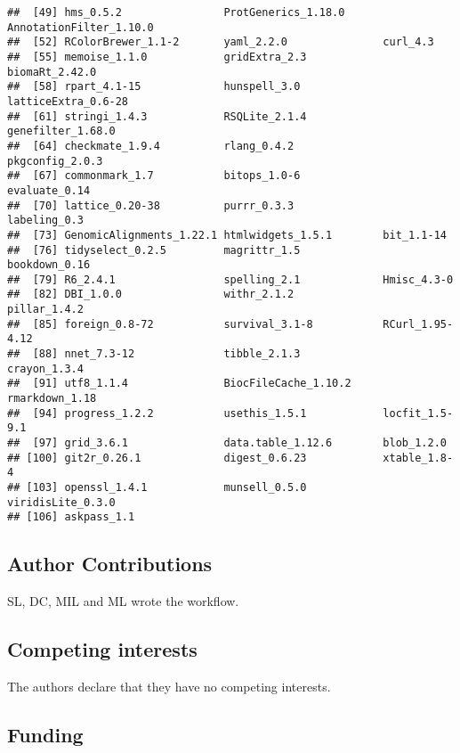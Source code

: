 \documentclass[
  9pt,
  a4paper,
]{extarticle}
\begin{document}
\begin{verbatim}
##  [49] hms_0.5.2                ProtGenerics_1.18.0      AnnotationFilter_1.10.0 
##  [52] RColorBrewer_1.1-2       yaml_2.2.0               curl_4.3                
##  [55] memoise_1.1.0            gridExtra_2.3            biomaRt_2.42.0          
##  [58] rpart_4.1-15             hunspell_3.0             latticeExtra_0.6-28     
##  [61] stringi_1.4.3            RSQLite_2.1.4            genefilter_1.68.0       
##  [64] checkmate_1.9.4          rlang_0.4.2              pkgconfig_2.0.3         
##  [67] commonmark_1.7           bitops_1.0-6             evaluate_0.14           
##  [70] lattice_0.20-38          purrr_0.3.3              labeling_0.3            
##  [73] GenomicAlignments_1.22.1 htmlwidgets_1.5.1        bit_1.1-14              
##  [76] tidyselect_0.2.5         magrittr_1.5             bookdown_0.16           
##  [79] R6_2.4.1                 spelling_2.1             Hmisc_4.3-0             
##  [82] DBI_1.0.0                withr_2.1.2              pillar_1.4.2            
##  [85] foreign_0.8-72           survival_3.1-8           RCurl_1.95-4.12         
##  [88] nnet_7.3-12              tibble_2.1.3             crayon_1.3.4            
##  [91] utf8_1.1.4               BiocFileCache_1.10.2     rmarkdown_1.18          
##  [94] progress_1.2.2           usethis_1.5.1            locfit_1.5-9.1          
##  [97] grid_3.6.1               data.table_1.12.6        blob_1.2.0              
## [100] git2r_0.26.1             digest_0.6.23            xtable_1.8-4            
## [103] openssl_1.4.1            munsell_0.5.0            viridisLite_0.3.0       
## [106] askpass_1.1
\end{verbatim}

\hypertarget{author-contributions}{%
\subsection{Author Contributions}\label{author-contributions}}

SL, DC, MIL and ML wrote the workflow.

\hypertarget{competing-interests}{%
\subsection{Competing interests}\label{competing-interests}}

The authors declare that they have no competing interests.

\hypertarget{funding}{%
\subsection{Funding}\label{funding}}
\end{document}
